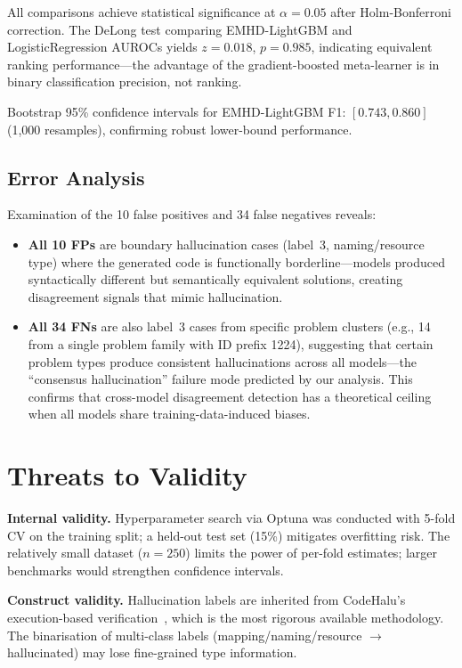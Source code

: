 \documentclass[runningheads]{llncs}
\begin{document}
All comparisons achieve statistical significance at $\alpha = 0.05$ after Holm-Bonferroni correction. The DeLong test comparing EMHD-LightGBM and LogisticRegression AUROCs yields $z = 0.018$, $p = 0.985$, indicating equivalent ranking performance---the advantage of the gradient-boosted meta-learner is in binary classification precision, not ranking.

Bootstrap 95\% confidence intervals for EMHD-LightGBM F1: $[0.743, 0.860]$ (1,000 resamples), confirming robust lower-bound performance.

\subsection{Error Analysis}

Examination of the 10 false positives and 34 false negatives reveals:
\begin{itemize}
\item \textbf{All 10 FPs} are boundary hallucination cases (label~3, naming/resource type) where the generated code is functionally borderline---models produced syntactically different but semantically equivalent solutions, creating disagreement signals that mimic hallucination.
\item \textbf{All 34 FNs} are also label~3 cases from specific problem clusters (e.g., 14 from a single problem family with ID prefix 1224), suggesting that certain problem types produce consistent hallucinations across all models---the ``consensus hallucination'' failure mode predicted by our analysis. This confirms that cross-model disagreement detection has a theoretical ceiling when all models share training-data-induced biases.
\end{itemize}


\section{Threats to Validity}
\label{sec:threats}

\textbf{Internal validity.} Hyperparameter search via Optuna was conducted with 5-fold CV on the training split; a held-out test set (15\%) mitigates overfitting risk. The relatively small dataset ($n=250$) limits the power of per-fold estimates; larger benchmarks would strengthen confidence intervals.

\textbf{Construct validity.} Hallucination labels are inherited from CodeHalu's execution-based verification~\cite{tian2025codehalu}, which is the most rigorous available methodology. The binarisation of multi-class labels (mapping/naming/resource $\to$ hallucinated) may lose fine-grained type information.
\end{document}
